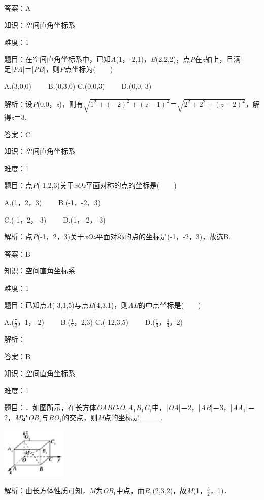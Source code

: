 \documentclass{article} %
\begin{document}
答案：A

知识：空间直角坐标系

难度：1

题目：在空间直角坐标系中，已知\textit{A}(1，-2,1)，\textit{B}(2,2,2)，点\textit{P}在\textit{z}轴上，且满足|\textit{PA}|＝|\textit{PB}|，则\textit{P}点坐标为(　　)

A.(3,0,0)　　 B.(0,3,0) C.(0,0,3)　　 D.(0,0,-3)

解析：设\textit{P}(0,0，\textit{z})，则有$\sqrt{1^2+(-2)^2+(z-1)^2}$＝$\sqrt{2^2+2^2+(z-2)^2}$，解得\textit{z}＝3.

答案：C

知识：空间直角坐标系

难度：1

题目：点\textit{P}(-1,2,3)关于\textit{xOz}平面对称的点的坐标是(　　)

A.(1，2，3)　　        B.(-1，-2，3)

C.(-1，2，-3)　　     D.(1，-2，-3)

解析：点\textit{P}(-1，2，3)关于\textit{xOz}平面对称的点的坐标是(-1，-2，3)，故选B.

答案：B

知识：空间直角坐标系

难度：1

题目：已知点\textit{A}(-3,1,5)与点\textit{B}(4,3,1)，则\textit{AB}的中点坐标是(　　)

A.($\frac{7}{2}$，1，-2)　　 B.($\frac{1}{2}$，2,3) C.(-12,3,5)　　 D.($\frac{1}{3}$，$\frac{4}{3}$，2)

解析：

答案：B

知识：空间直角坐标系

难度：1

题目：．如图所示，在长方体\textit{OABC}-\textit{O}${}_{1}$\textit{A}${}_{1}$\textit{B}${}_{1}$\textit{C}${}_{1}$中，|\textit{OA}|＝2，|\textit{AB}|＝3，|\textit{AA}${}_{1}$|＝2，\textit{M}是\textit{OB}${}_{1}$与\textit{BO}${}_{1}$的交点，则\textit{M}点的坐标是\_\_\_\_.

\includegraphics*[width=1.23in, height=0.96in, keepaspectratio=false]{image309}

解析：由长方体性质可知，\textit{M}为\textit{OB}${}_{1}$中点，而\textit{B}${}_{1}$(2,3,2)，故\textit{M}(1，$\frac{3}{2}$，1)．
\end{document}
